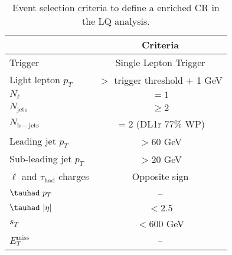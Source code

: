 \begin{table}
  \centering
  \begin{tabular}{l|c} 
    \hline\hline
                                             & Criteria \\ \hline
    Trigger                                  & Single Lepton Trigger \\
    Light lepton $p_T$                       & $>$ trigger threshold + 1 GeV \\
    $N_{\ell}$                               & $=1$ \\
    $N_{\mathrm{jets}}$                      & $\geq 2$ \\
    $N_{\mathrm{b-jets}}$                    & $=2$ (DL1r 77\% WP)\\
    Leading jet $p_T$                        & $>60$ GeV \\
    Sub-leading jet $p_T$                    & $>20$ GeV \\
    $\ell$ and $\tau_{\mathrm{had}}$ charges & Opposite sign\\
    $\tauhad~p_T$                            & -- \\
    $\tauhad~|\eta|$                         & $<2.5$ \\
    $s_T$                                    & $< 600$ GeV \\
    $E_{T}^{\mathrm{miss}}$                  & -- \\
    \hline\hline
  \end{tabular}
  \caption{Event selection criteria to define a \ttbar enriched CR in the LQ analysis.}
  \label{tab:lq_lephad_ttbarCR_event_selection}
\end{table}




